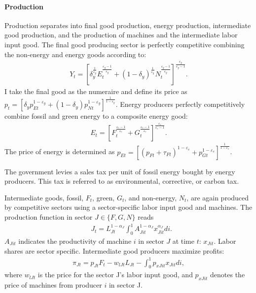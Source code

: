 \paragraph{Production}
Production separates into final good production, energy production, intermediate good production, and the production of machines and the intermediate labor input good. 
The final good producing sector is perfectly competitive combining the non-energy and energy goods according to:
\begin{align*}
Y_t=\left[\delta_y^\frac{1}{\varepsilon_y}E_{t}^{\frac{\varepsilon_y-1}{\varepsilon_y}}+(1-\delta_y)^\frac{1}{\varepsilon_y}N_{t}^{\frac{\varepsilon_y-1}{\varepsilon_y}}\right]^\frac{\varepsilon_y}{\varepsilon_y-1}.
\end{align*} 
I take the final good as the numeraire and define its price as $p_t=\left[\delta_yp_{Et}^{1-\varepsilon_y}+(1-\delta_y)p_{Nt}^{1-\varepsilon_y}\right]^{\frac{1}{1-\varepsilon_y}}$.
Energy producers perfectly competitively combine fossil and green energy to a composite energy good:
\begin{align*}
E_t=\left[F_t^\frac{\varepsilon_e-1}{\varepsilon_e}+G_t^\frac{\varepsilon_e-1}{\varepsilon_e}\right]^\frac{\varepsilon_e}{\varepsilon_e-1}.
\end{align*}
The price of energy is determined as  $p_{Et}= \left[(p_{Ft}+\tau_{Ft})^{1-\varepsilon_e}+p_{Gt}^{1-\varepsilon_e}\right]^\frac{1}{{1-\varepsilon_e}}$.



The government levies a sales tax per unit of fossil energy bought by energy producers. This tax is referred to as environmental, corrective, or carbon tax. 

Intermediate goods, fossil, $F_t$, green, $G_t$, and non-energy, $N_t$, are again produced by competitive sectors using a sector-specific labor input good and machines. The production function in sector $J\in \{F,G,N\}$ reads
\begin{align*}
&J_{t}= L_{Jt}^{1-\alpha_J}\int_{0}^{1}A_{Jit}^{1-\alpha_J}x_{Jit}^{\alpha_J} di.
\end{align*}
$A_{Jit}$ indicates the productivity of machine $i$ in sector $J$ at time $t$: $x_{Jit}$. 
Labor shares are sector specific. 
Intermediate good producers maximize profits: 
\begin{align*}
\pi_{Jt}=p_{Jt}F_t-w_{lJt}L_{Jt}-\int_{0}^{1}p_{xJit}x_{Jit}di,
\end{align*}
where $w_{lJt}$ is the price for the sector J's labor input good, and $p_{xJit}$ denotes the price of machines from producer $i$ in sector J. 

